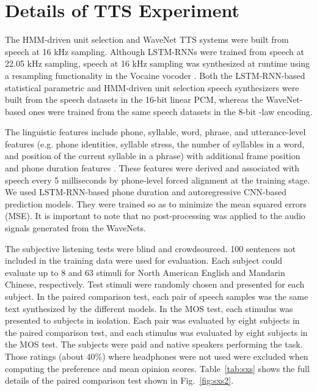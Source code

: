 \documentclass{article}
\makeatletter
\newcommand{\figref}[1]{Fig.~\ref{#1}}
\newcommand{\tblref}[1]{Table~\ref{#1}}
\newcommand*{\eg}{e.g.\@\xspace}
\makeatother
\begin{document}
 
\section{Details of TTS Experiment}
\label{appendix:tts_experiment}

The HMM-driven unit selection and WaveNet TTS systems were built from speech at 16 kHz sampling.
Although LSTM-RNNs were trained from speech at 22.05 kHz sampling, 
speech at 16 kHz sampling was synthesized at runtime using a resampling functionality in the Vocaine vocoder \citep{Vocaine}.
Both the LSTM-RNN-based statistical parametric and HMM-driven unit selection speech synthesizers were built from the speech datasets in the 16-bit linear PCM, whereas the WaveNet-based ones were trained from the same speech datasets in the 8-bit -law encoding.

The linguistic features include phone, syllable, word, phrase, and utterance-level features \citep{HTS_label} (\eg phone identities, syllable stress, the number of syllables in a word, and position of the current syllable
in a phrase) with additional frame position and phone duration features \citep{Zen_DNN_ICASSP}. These features were derived and associated with speech every 5 milliseconds by phone-level forced alignment at the training stage.
We used LSTM-RNN-based phone duration and autoregressive CNN-based  prediction models.
They were trained so as to minimize the mean squared errors (MSE).
It is important to note that no post-processing was applied to the audio signals generated from the WaveNets.

The subjective listening tests were blind  and crowdsourced. 
100 sentences not included in the training data were used for evaluation.
Each subject could evaluate up to 8 and 63 stimuli for North American English and Mandarin Chinese, respectively.
Test stimuli were randomly chosen and presented for each subject.
In the paired comparison test, each pair of speech samples was the same text synthesized by the different models.
In the MOS test, each stimulus was presented to subjects in isolation.
Each pair was evaluated by eight subjects in the paired comparison test, and each stimulus was evaluated by eight subjects in the MOS test.
The subjects were paid and native speakers performing the task.
Those ratings (about 40\%) where headphones were not used were excluded when computing the preference and mean opinion scores.
\tblref{tab:sxs} shows the full details of the paired comparison test shown in \figref{fig:sxs2}.
\end{document}
